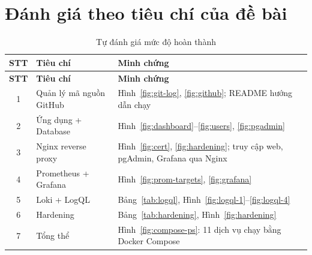 \documentclass[../main.tex]{subfiles}
\begin{document}
\section{Đánh giá theo tiêu chí của đề bài}
\begin{longtable}{|c|p{4.2cm}|p{9.4cm}|}
\caption{Tự đánh giá mức độ hoàn thành}
\label{tab:danh-gia}\\
\hline
\textbf{STT} & \textbf{Tiêu chí} & \textbf{Minh chứng} \\
\hline
\endfirsthead
\hline
\textbf{STT} & \textbf{Tiêu chí} & \textbf{Minh chứng} \\
\hline
\endhead
1 & Quản lý mã nguồn GitHub & Hình~\ref{fig:git-log}, \ref{fig:github}; README hướng dẫn chạy \\ \hline
2 & Ứng dụng + Database & Hình~\ref{fig:dashboard}--\ref{fig:users}, \ref{fig:pgadmin} \\ \hline
3 & Nginx reverse proxy & Hình~\ref{fig:cert}, \ref{fig:hardening}; truy cập web, pgAdmin, Grafana qua Nginx \\ \hline
4 & Prometheus + Grafana & Hình~\ref{fig:prom-targets}, \ref{fig:grafana} \\ \hline
5 & Loki + LogQL & Bảng~\ref{tab:logql}, Hình~\ref{fig:logql-1}--\ref{fig:logql-4} \\ \hline
6 & Hardening & Bảng~\ref{tab:hardening}, Hình~\ref{fig:hardening} \\ \hline
7 & Tổng thể & Hình~\ref{fig:compose-ps}: 11 dịch vụ chạy bằng Docker Compose \\ \hline
\end{longtable}
\end{document}
